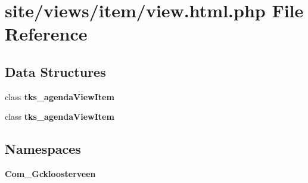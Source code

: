 \section{site/views/item/view.html.\+php File Reference}
\label{site_2views_2item_2view_8html_8php}
\subsection*{Data Structures}
\begin{DoxyCompactItemize}
\item 
class \textbf{ tks\+\_\+agenda\+View\+Item}
\item 
class \textbf{ tks\+\_\+agenda\+View\+Item}
\end{DoxyCompactItemize}
\subsection*{Namespaces}
\begin{DoxyCompactItemize}
\item 
 \textbf{ Com\+\_\+\+Gckloosterveen}
\end{DoxyCompactItemize}
